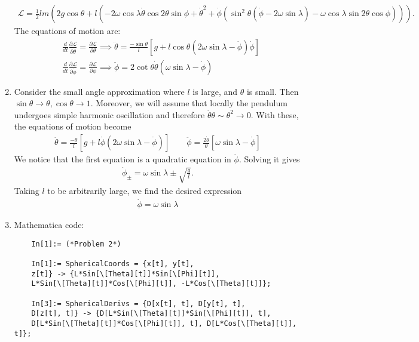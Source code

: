 \documentclass{article}
\theoremstyle{definition}
\newcommand{\p}{\partial}
\newcommand{\lag}{\mathcal{L}}
\newcommand{\f}[2]{\frac{#1}{#2}}
\newcommand{\lp}{\left(}
\newcommand{\rp}{\right)}
\newcommand{\lb}{\left[}
\newcommand{\rb}{\right]}
\begin{document}
\begin{enumerate}[label=(\alph*)]
	\begin{align*}
	\lag = \frac{1}{2} l m \left(2 g \cos\theta+l \left(-2 \omega  \cos\lambda  \dot\theta
	\cos 2 \theta \sin \phi +\dot\theta^2+\dot\phi \left(\sin^2\theta\left(\dot\phi-2 \omega  \sin \lambda \right)-\omega  \cos \lambda  \sin 2\theta  \cos \phi\right)\right)\right).
	\end{align*}
	The equations of motion are:
	\begin{align*}
	&\f{d}{dt} \f{\p \lag}{\p \dot{\theta}} = \f{\p \lag}{\p \theta} \implies 
	\boxed{\ddot\theta = \f{-\sin\theta }{l}\lb g+ l\cos\theta(2\omega\sin\lambda - \dot\phi)\dot\phi  \rb}\\
	&\f{d}{dt} \f{\p \lag}{\p \dot\phi} = \f{\p \lag}{\p \phi} \implies \boxed{\ddot\phi = 2\cot\theta \dot\theta \lp \omega\sin\lambda - \dot\phi \rp }
	\end{align*}
	
	
	\item Consider the small angle approximation where $l$ is large, and $\theta$ is small. Then $\sin\theta \to \theta, \cos\theta \to 1$. Moreover, we will assume that locally the pendulum undergoes simple harmonic oscillation and therefore $\ddot\theta \theta \sim \theta^2 \to 0$. With these, the equations of motion become
	\begin{align*}
	\boxed{\ddot\theta = \f{-\theta  }{l}\lb g+ l\dot\phi (2\omega\sin\lambda - \dot\phi) \rb} 
	\quad \quad 
	\boxed{\ddot\phi = \f{2\dot\theta }{\theta} \lb \omega\sin\lambda - \dot\phi \rb }
	\end{align*}
	We notice that the first equation is a quadratic equation in $\dot\phi$. Solving it gives
	\begin{align*}
	\dot\phi_\pm = \omega \sin\lambda \pm \sqrt{\f{g}{l}}.
	\end{align*}
	Taking $l$ to be arbitrarily large, we find the desired expression
	\begin{align*}
	\boxed{\dot\phi = \omega\sin\lambda}
	\end{align*}
	
	
	\item Mathematica code:
	\begin{lstlisting}
	In[1]:= (*Problem 2*)
	
	In[1]:= SphericalCoords = {x[t], y[t], 
	z[t]} -> {L*Sin[\[Theta][t]]*Sin[\[Phi][t]], 
	L*Sin[\[Theta][t]]*Cos[\[Phi][t]], -L*Cos[\[Theta][t]]};
	
	In[3]:= SphericalDerivs = {D[x[t], t], D[y[t], t], 
	D[z[t], t]} -> {D[L*Sin[\[Theta][t]]*Sin[\[Phi][t]], t], 
	D[L*Sin[\[Theta][t]]*Cos[\[Phi][t]], t], D[L*Cos[\[Theta][t]], t]};
	

\end{lstlisting}
\end{enumerate}
\end{document}
